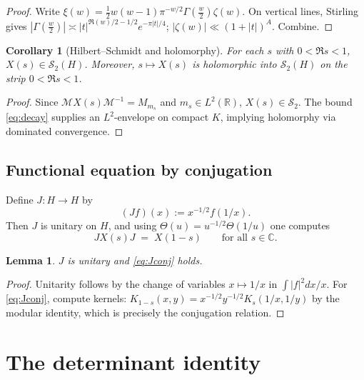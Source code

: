 \documentclass[11pt]{article}
\numberwithin{equation}{section}
\newtheorem{lemma}[theorem]{Lemma}
\newtheorem{corollary}[theorem]{Corollary}
\theoremstyle{definition}
\theoremstyle{remark}
\newcommand{\C}{\mathbb{C}}
\newcommand{\R}{\mathbb{R}}
\newcommand{\Hs}{\mathcal{S}_2}
\newcommand{\1}{\mathbbm{1}}
\newcommand{\cM}{\mathcal{M}}
\begin{document}
\begin{proof}
Write \(\xi(w)=\frac12 w(w-1)\pi^{-w/2}\Gamma(\tfrac{w}{2})\zeta(w)\). On vertical lines, Stirling gives \(|\Gamma(\tfrac{w}{2})|\asymp |t|^{\Re(w)/2-1/2} e^{-\pi|t|/4}\); \(|\zeta(w)|\ll (1+|t|)^A\). Combine.
\end{proof}

\begin{corollary}[Hilbert--Schmidt and holomorphy]\label{cor:HSHol}
For each \(s\) with \(0<\Re s<1\), \(X(s)\in \Hs(H)\). Moreover, \(s\mapsto X(s)\) is holomorphic into \(\Hs(H)\) on the strip \(0<\Re s<1\).
\end{corollary}

\begin{proof}
Since \(\cM X(s)\cM^{-1}=M_{m_s}\) and \(m_s\in L^2(\R)\), \(X(s)\in\Hs\). The bound \eqref{eq:decay} supplies an \(L^2\)-envelope on compact \(K\), implying holomorphy via dominated convergence.
\end{proof}

\subsection{Functional equation by conjugation}
Define \(J:H\to H\) by
\begin{equation}\label{eq:J}
(Jf)(x):=x^{-1/2} f(1/x).
\end{equation}
Then \(J\) is unitary on \(H\), and using \(\Theta(u)=u^{-1/2}\Theta(1/u)\) one computes
\begin{equation}\label{eq:Jconj}
J X(s) J \;=\; X(1-s)\qquad \text{for all } s\in\C.
\end{equation}

\begin{lemma}\label{lem:Junitary}
\(J\) is unitary and \eqref{eq:Jconj} holds.
\end{lemma}

\begin{proof}
Unitarity follows by the change of variables \(x\mapsto 1/x\) in \(\int |f|^2 dx/x\). For \eqref{eq:Jconj}, compute kernels:
\(
K_{1-s}(x,y)
=x^{-1/2}y^{-1/2} K_s(1/x,1/y)
\)
by the modular identity, which is precisely the conjugation relation.
\end{proof}

\section{The determinant identity}\label{sec:DetIdentity}
\end{document}
